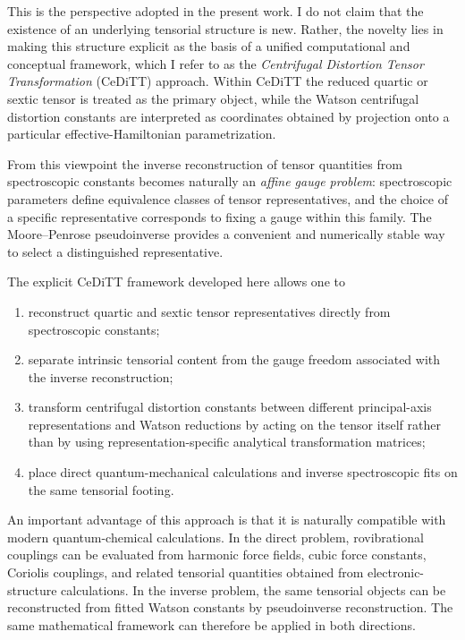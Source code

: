 This is the perspective adopted in the present work. I do not claim
that the existence of an underlying tensorial structure is new.
Rather, the novelty lies in making this structure explicit as the
basis of a unified computational and conceptual framework, which I
refer to as the \emph{Centrifugal Distortion Tensor Transformation}
(CeDiTT) approach. Within CeDiTT the reduced quartic or sextic tensor
is treated as the primary object, while the Watson centrifugal
distortion constants are interpreted as coordinates obtained by
projection onto a particular effective-Hamiltonian parametrization.

From this viewpoint the inverse reconstruction of tensor quantities
from spectroscopic constants becomes naturally an \emph{affine gauge
problem}: spectroscopic parameters define equivalence classes of
tensor representatives, and the choice of a specific representative
corresponds to fixing a gauge within this family. The Moore--Penrose
pseudoinverse provides a convenient and numerically stable way to
select a distinguished representative.

The explicit CeDiTT framework developed here allows one to
\begin{enumerate}
\item reconstruct quartic and sextic tensor representatives directly
from spectroscopic constants;
\item separate intrinsic tensorial content from the gauge freedom
associated with the inverse reconstruction;
\item transform centrifugal distortion constants between different
principal-axis representations and Watson reductions by acting on the
tensor itself rather than by using representation-specific analytical
transformation matrices;
\item place direct quantum-mechanical calculations and inverse
spectroscopic fits on the same tensorial footing.
\end{enumerate}

An important advantage of this approach is that it is naturally
compatible with modern quantum-chemical calculations. In the direct
problem, rovibrational couplings can be evaluated from harmonic force
fields, cubic force constants, Coriolis couplings, and related
tensorial quantities obtained from electronic-structure calculations.
In the inverse problem, the same tensorial objects can be reconstructed
from fitted Watson constants by pseudoinverse reconstruction. The same
mathematical framework can therefore be applied in both directions.

